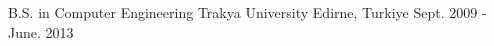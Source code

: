

\begin{cventries}

    \cventry
    {B.S. in Computer Engineering} %
    {Trakya University} %
    {Edirne, Turkiye} %
    {Sept. 2009 - June. 2013} %
    {}

\end{cventries}

